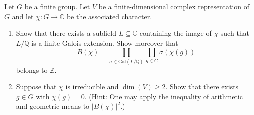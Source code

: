 \begin{exercise}
\label{algebra:2018:9}
Let $G$ be a finite group. Let $V$ be a finite-dimensional complex representation of $G$ and let $\chi: G \to \mathbb{C}$ be the associated character.
\begin{enumerate}
    \item Show that there exists a subfield $L \subseteq \mathbb{C}$ containing the image of $\chi$ such that $L/\mathbb{Q}$ is a finite Galois extension. Show moreover that
    \[
    B(\chi) = \prod_{\sigma \in \mathrm{Gal}(L/\mathbb{Q})} \prod_{g \in G} \sigma(\chi(g))
    \]
    belongs to $\mathbb{Z}$.
    \item Suppose that $\chi$ is irreducible and $\dim(V) \geq 2$. Show that there exists $g \in G$ with $\chi(g) = 0$. (Hint: One may apply the inequality of arithmetic and geometric means to $|B(\chi)|^2$.)
\end{enumerate}
\end{exercise}
